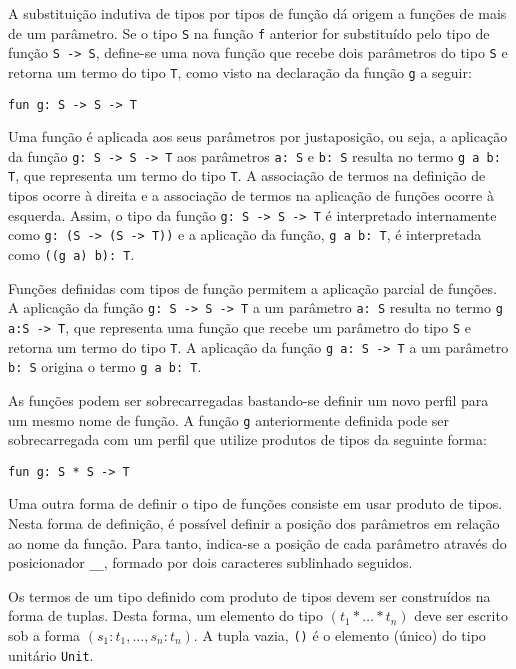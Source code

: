 A substituição indutiva de tipos por tipos de função dá origem a funções de mais de um parâmetro.
Se o tipo \Verb.S. na função \Verb.f. anterior for substituído pelo tipo de função \Verb.S -> S., define-se uma nova função que recebe dois parâmetros do tipo \Verb.S. e retorna um termo do tipo \Verb.T., como visto na declaração da função \Verb.g. a seguir:

\begin{Verbatim}
fun g: S -> S -> T
\end{Verbatim}

Uma função é aplicada aos seus parâmetros por justaposição, ou seja, a aplicação da função \Verb.g: S -> S -> T. aos parâmetros \Verb.a: S. e \Verb.b: S. resulta no termo \Verb.g a b: T., que representa um termo do tipo \Verb.T..
A associação de termos na definição de tipos ocorre à direita e a associação de termos na aplicação de funções ocorre à esquerda.
Assim, o tipo da função \Verb.g: S -> S -> T. é interpretado internamente como \Verb.g: (S -> (S -> T)). e a aplicação da função, \Verb.g a b: T., é interpretada como \Verb.((g a) b): T..

Funções definidas com tipos de função permitem a aplicação parcial de funções.
A aplicação da função \Verb.g: S -> S -> T. a um parâmetro \Verb.a: S. resulta no termo \Verb.g a:S -> T., que representa uma função que recebe um parâmetro do tipo \Verb.S. e retorna um termo do tipo \Verb.T..
A aplicação da função \Verb.g a: S -> T. a um parâmetro \Verb.b: S. origina o termo \Verb.g a b: T..

As funções podem ser sobrecarregadas bastando-se definir um novo perfil para um mesmo nome de função.
A função \Verb.g. anteriormente definida pode ser sobrecarregada com um perfil que utilize produtos de tipos da seguinte forma:

\begin{Verbatim}
fun g: S * S -> T
\end{Verbatim}

Uma outra forma de definir o tipo de funções consiste em usar produto de tipos.
Nesta forma de definição, é possível definir a posição dos parâmetros em relação ao nome da função.
Para tanto, indica-se a posição de cada parâmetro através do posicionador \Verb.__., formado por dois caracteres sublinhado seguidos.

Os termos de um tipo definido com produto de tipos devem ser construídos na forma de tuplas.
Desta forma, um elemento do tipo $(t_{1} * \ldots * t_{n})$ deve ser escrito sob a forma $(s_{1}: t_{1}, \ldots, s_{n}: t_{n})$.
A tupla vazia, \Verb.(). é o elemento (único) do tipo unitário \Verb.Unit..

